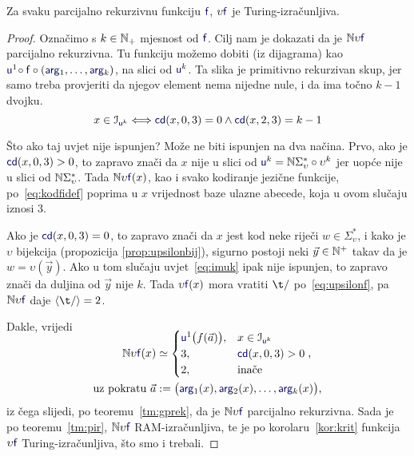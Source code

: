 \begin{teorem}\label{tm:piut}
Za svaku parcijalno rekurzivnu funkciju $\f f$, $\upsilon\f f$ je Turing-izračunljiva.
\end{teorem}
\begin{proof}
Označimo s $k\in{\mathbb N}_+$ mjesnost od $\f f$. Cilj nam je dokazati da je $\N\upsilon\f f$ parcijalno rekurzivna. Tu funkciju možemo dobiti (iz dijagrama) kao $\f u^1\!\circ\f f\circ(\f{arg}_1,\dotsc,\f{arg}_k)$, na slici od $\f u^k$. Ta slika je primitivno rekurzivan skup, jer samo treba provjeriti da njegov element nema nijedne nule, i da ima točno $k-1$ dvojku.
\begin{equation}\label{eq:imuk}
    x\in\im{\f u^k}\Longleftrightarrow\f{cd}(x,0,3)=0\land\f{cd}(x,2,3)=k-1
\end{equation}

Što ako taj uvjet nije ispunjen? Može ne biti ispunjen na dva načina. Prvo, ako je $\f{cd}(x,0,3)>0$, to zapravo znači da $x$ nije u slici od $\f u^k=\N\Sigma_\upsilon^*\circ\upsilon^k$ jer uopće nije u slici od ${\mathbb N}\Sigma_\upsilon^*$. Tada $\N\upsilon\f f(x)$, kao i svako kodiranje jezične funkcije, po~\eqref{eq:kodfidef} poprima u $x$ vrijednost baze ulazne abecede, koja u ovom slučaju iznosi $3$.

Ako je $\f{cd}(x,0,3)=0$, to zapravo znači da $x$ jest kod neke riječi $w\in\Sigma_\upsilon^*$, i kako je $\upsilon$ bijekcija (propozicija \ref{prop:upsilonbij}), sigurno postoji neki $\vec y\in{\mathbb N}^+$ takav da je $w=\upsilon(\vec y)$. Ako u tom slučaju uvjet~\eqref{eq:imuk} ipak nije ispunjen, to zapravo znači da duljina od $\vec y$ nije $k$. Tada $\upsilon \f f(x)$ mora vratiti $\t/$ po~\eqref{eq:upsilonf}, pa $\N\upsilon\f f$ daje $\kr{\t/}=2$.

Dakle, vrijedi
\begin{align}
\SwapAboveDisplaySkip
\label{eq:defNupsf}
    \N\upsilon\f f(x)&\simeq\begin{cases}
    \f u^1\bigl(f(\vec a)\bigr),&x\in\im{\f u^k}\\
    3,&\f{cd}(x,0,3)>0\\
    2,&\text{inače}
    \end{cases}\text,\\
    \text{uz pokratu }\vec a&:=\bigl(\f{arg}_1(x),\f{arg}_2(x),\dotsc,\f{arg}_k(x)\bigr)\text,
\end{align}
iz čega slijedi, po teoremu~\ref{tm:gprek}, da je $\N\upsilon\f f$ parcijalno rekurzivna. Sada je po teoremu~\ref{tm:pir}, $\N\upsilon\f f$ RAM-izračunljiva, te je po korolaru~\ref{kor:krit} funkcija $\upsilon\f f$ Turing-iz\-rač\-un\-lji\-va, što smo i trebali.
\end{proof}

